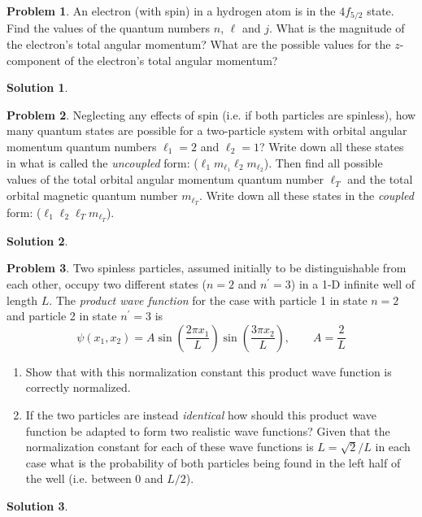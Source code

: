 \documentclass[10pt]{article}
\theoremstyle{definition}
\newtheorem{problem}{Problem}
\newtheorem{soln}{Solution}
\begin{document}
\begin{problem}
An electron (with spin) in a hydrogen atom is in the $4f_{5/2}$ state. Find the values of the quantum numbers
$n$, $\ell$ and $j$. What is the magnitude of the electron's total angular momentum? What are the possible values
for the $z$-component of the electron's total angular momentum?
\end{problem}
\begin{soln}
\end{soln}

\begin{problem}
Neglecting any effects of spin (i.e. if both particles are spinless), how many quantum states are possible
for a two-particle system with orbital angular momentum quantum numbers $\ell_1=2$ and $\ell_2=1$? Write down
all these states in what is called the \emph{uncoupled} form: ($\ell_1m_{\ell_1}\ell_2m_{\ell_2}$). Then find all possible values of the
total orbital angular momentum quantum number $\ell_T$ and the total orbital magnetic quantum number $m_{\ell_T}$. Write down all these states
in the \emph{coupled} form: ($\ell_1\ell_2\ell_Tm_{\ell_T}$).
\end{problem}
\begin{soln}
\end{soln}

\begin{problem}
Two spinless particles, assumed initially to be distinguishable from each other, occupy two different
states ($n=2$ and $n^\prime=3$) in a 1-D infinite well of length $L$. The \emph{product wave function} for the case with particle 1 in
state $n=2$ and particle 2 in state $n^\prime=3$ is
$$\psi(x_1,x_2)=A\sin\left(\frac{2\pi x_1}{L}\right)\sin\left(\frac{3\pi x_2}{L}\right),\qquad A=\frac{2}{L}$$
\begin{enumerate}[label=(\alph*)]
  \item Show that with this normalization constant this product wave function is correctly normalized.
  \item If the two particles are instead \emph{identical} how should this product wave function be adapted to form two
        realistic wave functions? Given that the normalization constant for each of these wave functions is $L=\sqrt{2}/L$
        in each case what is the probability of both particles being found in the left half of the well (i.e. between $0$ and $L/2$).
\end{enumerate}
\end{problem}
\begin{soln}
\end{soln}
\end{document}
